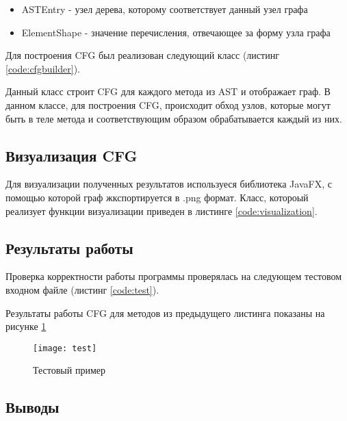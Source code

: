 \begin{itemize}
\item ASTEntry - узел дерева, которому соответствует данный узел графа
\item ElementShape - значение перечисления, отвечающее за форму узла графа
\end{itemize}

Для построения CFG был реализован следующий класс (листинг \ref{code:cfgbuilder}).


\parindent=1cm

Данный класс строит CFG для каждого метода из AST и отображает граф. В данном классе, для построения CFG, происходит обход узлов, которые могут быть в теле метода и соответствующим образом обрабатывается каждый из них.

\subsection{Визуализация CFG}

Для визуализации полученных результатов используеся библиотека JavaFX, с помощью которой граф жкспортируется в .png формат. Класс, котороый реализует функции визуализации приведен в листинге \ref{code:visualization}.


\parindent=1cm

\subsection{Результаты работы}

Проверка корректности работы программы проверялась на следующем тестовом входном файле (листинг \ref{code:test}).


\parindent=1cm

Результаты работы CFG для методов из предыдущего листинга показаны на рисунке \ref{pic:test}

\begin{figure}[H]
	\begin{center}
		\texttt{[image: test]}
		\caption{Тестовый пример} 
		\label{pic:test} %
	\end{center}
\end{figure}

\subsection{Выводы}


